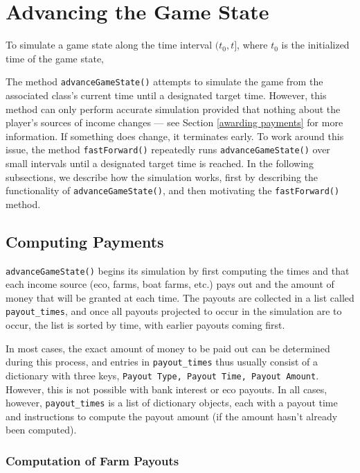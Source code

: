 \documentclass[12pt,letterpaper]{article}
\theoremstyle{remark}
\theoremstyle{plain}
\begin{document}
\section{Advancing the Game State}

To simulate a game state along the time interval $(t_0,t]$, where $t_0$ is the initialized time of the game state, 

The method \texttt{advanceGameState()} attempts to simulate the game from the associated class's current time until a designated target time. However, this method can only perform accurate simulation provided that nothing about the player's sources of income changes --- see Section \ref{awarding payments} for more information. If something does change, it terminates early. To work around this issue, the method \texttt{fastForward()} repeatedly runs \texttt{advanceGameState()} over small intervals until a designated target time is reached. In the following subsections, we describe how the simulation works, first by describing the functionality of \texttt{advanceGameState()}, and then motivating the \texttt{fastForward()} method.

\subsection{Computing Payments}

\texttt{advanceGameState()} begins its simulation by first computing the times and that each income source (eco, farms, boat farms, etc.) pays out and the amount of money that will be granted at each time. The payouts are collected in a list called \texttt{payout\_times}, and once all payouts projected to occur in the simulation are to occur, the list is sorted by time, with earlier payouts coming first.

In most cases, the exact amount of money to be paid out can be determined during this process, and entries in \texttt{payout\_times} thus usually consist of a dictionary with three keys, \texttt{Payout Type, Payout Time, Payout Amount}. However, this is not possible with bank interest or eco payouts. In all cases, however, \texttt{payout\_times} is a list of dictionary objects, each with a payout time and instructions to compute the payout amount (if the amount hasn't already been computed).

\subsubsection{Computation of Farm Payouts}\label{computation of farm payouts}
\end{document}
